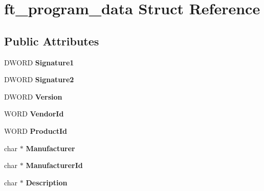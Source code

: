 \hypertarget{structft__program__data}{}\section{ft\+\_\+program\+\_\+data Struct Reference}
\label{structft__program__data}
\subsection*{Public Attributes}
\begin{DoxyCompactItemize}
\item 
D\+W\+O\+RD {\bfseries Signature1}\hypertarget{structft__program__data_a6b26e04c691ec5944d2fffec797c399a}{}\label{structft__program__data_a6b26e04c691ec5944d2fffec797c399a}

\item 
D\+W\+O\+RD {\bfseries Signature2}\hypertarget{structft__program__data_ab28a0f4509093050f1927f1e946f3d9f}{}\label{structft__program__data_ab28a0f4509093050f1927f1e946f3d9f}

\item 
D\+W\+O\+RD {\bfseries Version}\hypertarget{structft__program__data_a9ef2eb59fe9ef1699df92a9d50ac3a81}{}\label{structft__program__data_a9ef2eb59fe9ef1699df92a9d50ac3a81}

\item 
W\+O\+RD {\bfseries Vendor\+Id}\hypertarget{structft__program__data_a4d4e65a934b3a822d90d2b2fc461cb11}{}\label{structft__program__data_a4d4e65a934b3a822d90d2b2fc461cb11}

\item 
W\+O\+RD {\bfseries Product\+Id}\hypertarget{structft__program__data_a623b7980fadab4322ed41da598b45397}{}\label{structft__program__data_a623b7980fadab4322ed41da598b45397}

\item 
char $\ast$ {\bfseries Manufacturer}\hypertarget{structft__program__data_a803860e98c4c7be38685b9c69e4684a5}{}\label{structft__program__data_a803860e98c4c7be38685b9c69e4684a5}

\item 
char $\ast$ {\bfseries Manufacturer\+Id}\hypertarget{structft__program__data_a2e84082e1e7b7c8e117c19a536813da5}{}\label{structft__program__data_a2e84082e1e7b7c8e117c19a536813da5}

\item 
char $\ast$ {\bfseries Description}\hypertarget{structft__program__data_a254c31fdadcc3ce3748f6682083874a8}{}\label{structft__program__data_a254c31fdadcc3ce3748f6682083874a8}


\end{DoxyCompactItemize}
